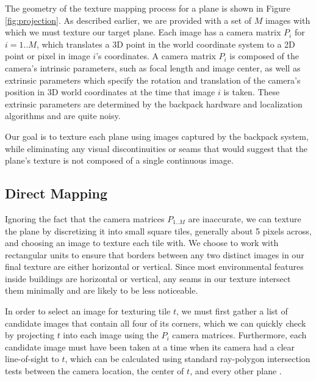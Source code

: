 \documentclass[10pt,twocolumn,letterpaper]{article}
\begin{document}
The geometry of the texture mapping process for a plane is shown in
Figure \ref{fig:projection}.  As described earlier, we are provided
with a set of $M$ images with which we must texture our target
plane. Each image has a camera matrix $P_i$ for $i=1..M$, which
translates a 3D point in the world coordinate system to a 2D point or
pixel in image $i$'s coordinates. A camera matrix $P_i$ is composed of
the camera's intrinsic parameters, such as focal length and image
center, as well as extrinsic parameters which specify the rotation and
translation of the camera's position in 3D world coordinates at the
time that image $i$ is taken. These extrinsic parameters are
determined by the backpack hardware and localization algorithms
\cite{chen2010indoor, liu2010indoor, kua2012loopclosure} and are quite
noisy.

Our goal is to texture each plane using images captured by the
backpack system, while eliminating any visual discontinuities or seams
that would suggest that the plane's texture is not composed of a
single continuous image.

\subsection{Direct Mapping}
\label{sec:directMapping}

Ignoring the fact that the camera matrices $P_{1..M}$ are inaccurate,
we can texture the plane by discretizing it into small square tiles,
generally about 5 pixels across, and choosing an image to texture each
tile with. We choose to work with rectangular units to ensure that
borders between any two distinct images in our final texture are
either horizontal or vertical. Since most environmental features
inside buildings are horizontal or vertical, any seams in our texture
intersect them minimally and are likely to be less noticeable.

In order to select an image for texturing tile $t$, we must first
gather a list of candidate images that contain all four of its
corners, which we can quickly check by projecting $t$ into each image
using the $P_i$ camera matrices. Furthermore, each candidate image
must have been taken at a time when its camera had a clear
line-of-sight to $t$, which can be calculated using standard
ray-polygon intersection tests between the camera location, the center
of $t$, and every other plane \cite{rayintersection}.
\end{document}
